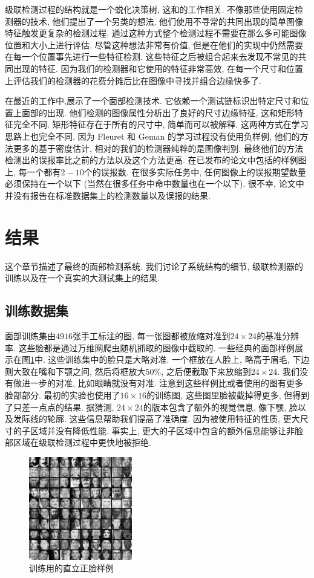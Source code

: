 \documentclass[a4paper,utf8,11pt, onecolumn]{ctexart}
\begin{document}
级联检测过程的结构就是一个蜕化决策树, 这和\citet{amit1999computational}的工作相关. 不像那些使用固定检测器的技术, 他们提出了一个另类的想法. 他们使用不寻常的共同出现的简单图像特征触发更复杂的检测过程.
通过这种方式整个检测过程不需要在那么多可能图像位置和大小上进行评估. 尽管这种想法非常有价值, 但是在他们的实现中仍然需要在每一个位置事先进行一些特征检测. 这些特征之后被组合起来去发现不常见的共同出现的特征. 因为我们的检测器和它使用的特征非常高效, 在每一个尺寸和位置上评估我们的检测器的花费分摊后比在图像中寻找并组合边缘快多了.

在最近的工作中,\citet{fleuret2001coarse}展示了一个面部检测技术. 它依赖一个测试链标识出特定尺寸和位置上面部的出现. 他们检测的图像属性分析出了良好的尺寸边缘特征, 这和矩形特征完全不同. 矩形特征存在于所有的尺寸中, 简单而可以被解释. 这两种方式在学习思路上也完全不同.
因为 Fleuret 和 Geman 的学习过程没有使用负样例, 他们的方法更多的基于密度估计, 相对的我们的检测器纯粹的是图像判别. 最终他们的方法检测出的误报率比之前\citet{rowley1998neural}的方法以及这个方法更高. 在已发布的论文中包括的样例图上, 每一个都有$2-10$个的误报数. 在很多实际任务中, 任何图像上的误报期望数量必须保持在一个以下 (当然在很多任务中命中数量也在一个以下). 很不幸, 论文中并没有报告在标准数据集上的检测数量以及误报的结果.
\section{结果}\label{sec:result}
这个章节描述了最终的面部检测系统. 我们讨论了系统结构的细节, 级联检测器的训练以及在一个真实的大测试集上的结果.
\subsection{训练数据集}
面部训练集由$4916$张手工标注的图, 每一张图都被放缩对准到$24\times24$的基准分辨率. 这些脸都是通过万维网爬虫随机抓取的图像中截取的. 一些经典的面部样例展示在图\ref{fig:face_used}中. 这些训练集中的脸只是大略对准. 一个框放在人脸上, 略高于眉毛, 下边则大致在嘴和下颚之间, 然后将框放大$50\%$, 之后便截取下来放缩到$24\times24$. 我们没有做进一步的对准, 比如眼睛就没有对准. 注意到这些样例比\citet{rowley1998neural}或者\citet{sung1998example}使用的图有更多脸部部分. 最初的实验也使用了$16\times16$的训练图, 这些图里脸被截掉得更多, 但得到了只差一点点的结果. 据猜测, $24\times24$的版本包含了额外的视觉信息, 像下颚, 脸以及发际线的轮廓. 这些信息帮助我们提高了准确度. 因为被使用特征的性质, 更大尺寸的子区域并没有降低性能. 事实上, 更大的子区域中包含的额外信息能够让非脸部区域在级联检测过程中更快地被拒绝.
\begin{figure}
\centering
\includegraphics[width=0.4\textwidth]{face_used.png}
\caption{训练用的直立正脸样例}
\label{fig:face_used}
\end{figure}
\end{document}
